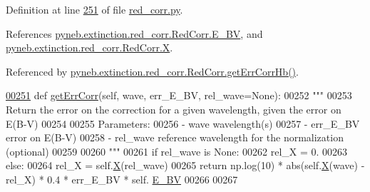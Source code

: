 \begin{DoxyVerb}
Definition at line \hyperlink{red__corr_8py_source_l00251}{251} of file \hyperlink{red__corr_8py_source}{red\+\_\+corr.\+py}.



References \hyperlink{red__corr_8py_source_l00203}{pyneb.\+extinction.\+red\+\_\+corr.\+Red\+Corr.\+E\+\_\+\+B\+V}, and \hyperlink{red__corr_8py_source_l00180}{pyneb.\+extinction.\+red\+\_\+corr.\+Red\+Corr.\+X}.



Referenced by \hyperlink{red__corr_8py_source_l00268}{pyneb.\+extinction.\+red\+\_\+corr.\+Red\+Corr.\+get\+Err\+Corr\+Hb()}.


\begin{DoxyCode}
\hypertarget{classpyneb_1_1extinction_1_1red__corr_1_1_red_corr_l00251}{}\hyperlink{classpyneb_1_1extinction_1_1red__corr_1_1_red_corr_a6e7097b97a6552f30422884af3faff69}{00251}     \textcolor{keyword}{def }\hyperlink{classpyneb_1_1extinction_1_1red__corr_1_1_red_corr_a6e7097b97a6552f30422884af3faff69}{getErrCorr}(self, wave, err\_E\_BV, rel\_wave=None):
00252         \textcolor{stringliteral}{"""}
00253 \textcolor{stringliteral}{        Return the error on the correction for a given wavelength, given the error on E(B-V)}
00254 \textcolor{stringliteral}{        }
00255 \textcolor{stringliteral}{        Parameters:}
00256 \textcolor{stringliteral}{            - wave         wavelength(s)}
00257 \textcolor{stringliteral}{            - err\_E\_BV     error on E(B-V)}
00258 \textcolor{stringliteral}{            - rel\_wave     reference wavelength for the normalization (optional)}
00259 \textcolor{stringliteral}{}
00260 \textcolor{stringliteral}{        """}
00261         \textcolor{keywordflow}{if} rel\_wave \textcolor{keywordflow}{is} \textcolor{keywordtype}{None}:
00262             rel\_X = 0.
00263         \textcolor{keywordflow}{else}:
00264             rel\_X = self.\hyperlink{classpyneb_1_1extinction_1_1red__corr_1_1_red_corr_aac92bb80311cda78c01e61aa44655251}{X}(rel\_wave)
00265         \textcolor{keywordflow}{return}  np.log(10) * abs(self.\hyperlink{classpyneb_1_1extinction_1_1red__corr_1_1_red_corr_aac92bb80311cda78c01e61aa44655251}{X}(wave) - rel\_X) * 0.4 * err\_E\_BV * self.
      \hyperlink{classpyneb_1_1extinction_1_1red__corr_1_1_red_corr_a0bc581bcaa8eeeb67b83ffdec58bf164}{E\_BV}
00266 
00267 
\end{DoxyCode}
\hypertarget{classpyneb_1_1extinction_1_1red__corr_1_1_red_corr_a296a9cd0f689dd7e9be3dc788e88ddaa}{}

\end{DoxyVerb}
